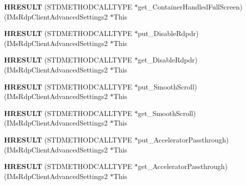 \begin{DoxyCompactItemize}
{\bfseries H\+R\+E\+S\+U\+LT} (S\+T\+D\+M\+E\+T\+H\+O\+D\+C\+A\+L\+L\+T\+Y\+PE $\ast$get\+\_\+\+Container\+Handled\+Full\+Screen)(I\+Ms\+Rdp\+Client\+Advanced\+Settings2 $\ast$This
\item 
\mbox{\label{struct_i_ms_rdp_client_advanced_settings2_vtbl_a34dc75157fdbc6f74fa90530f4e9a36a}} 
{\bfseries H\+R\+E\+S\+U\+LT} (S\+T\+D\+M\+E\+T\+H\+O\+D\+C\+A\+L\+L\+T\+Y\+PE $\ast$put\+\_\+\+Disable\+Rdpdr)(I\+Ms\+Rdp\+Client\+Advanced\+Settings2 $\ast$This
\item 
\mbox{\label{struct_i_ms_rdp_client_advanced_settings2_vtbl_a439b31e1e69f910468c7deadbd416650}} 
{\bfseries H\+R\+E\+S\+U\+LT} (S\+T\+D\+M\+E\+T\+H\+O\+D\+C\+A\+L\+L\+T\+Y\+PE $\ast$get\+\_\+\+Disable\+Rdpdr)(I\+Ms\+Rdp\+Client\+Advanced\+Settings2 $\ast$This
\item 
\mbox{\label{struct_i_ms_rdp_client_advanced_settings2_vtbl_a6c9687e070167022612386d0cf1c39c0}} 
{\bfseries H\+R\+E\+S\+U\+LT} (S\+T\+D\+M\+E\+T\+H\+O\+D\+C\+A\+L\+L\+T\+Y\+PE $\ast$put\+\_\+\+Smooth\+Scroll)(I\+Ms\+Rdp\+Client\+Advanced\+Settings2 $\ast$This
\item 
\mbox{\label{struct_i_ms_rdp_client_advanced_settings2_vtbl_a55096e42eeac240ab41f1960d3765f64}} 
{\bfseries H\+R\+E\+S\+U\+LT} (S\+T\+D\+M\+E\+T\+H\+O\+D\+C\+A\+L\+L\+T\+Y\+PE $\ast$get\+\_\+\+Smooth\+Scroll)(I\+Ms\+Rdp\+Client\+Advanced\+Settings2 $\ast$This
\item 
\mbox{\label{struct_i_ms_rdp_client_advanced_settings2_vtbl_a6116e4b2627adb9b0fa87f8efb5332f0}} 
{\bfseries H\+R\+E\+S\+U\+LT} (S\+T\+D\+M\+E\+T\+H\+O\+D\+C\+A\+L\+L\+T\+Y\+PE $\ast$put\+\_\+\+Accelerator\+Passthrough)(I\+Ms\+Rdp\+Client\+Advanced\+Settings2 $\ast$This
\item 
\mbox{\label{struct_i_ms_rdp_client_advanced_settings2_vtbl_adef2b13e3a1d264f06d3dbfeba3d80b9}} 
{\bfseries H\+R\+E\+S\+U\+LT} (S\+T\+D\+M\+E\+T\+H\+O\+D\+C\+A\+L\+L\+T\+Y\+PE $\ast$get\+\_\+\+Accelerator\+Passthrough)(I\+Ms\+Rdp\+Client\+Advanced\+Settings2 $\ast$This

\end{DoxyCompactItemize}
